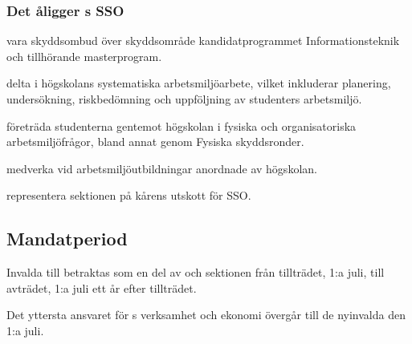 \subsubsection{Det åligger \STYRIT{}s SSO}
    \begin{att}
        \item vara skyddsombud över skyddsområde kandidatprogrammet Informationsteknik och tillhörande masterprogram.
        \item delta i högskolans systematiska arbetsmiljöarbete, vilket inkluderar planering, undersökning, riskbedömning och uppföljning av studenters arbetsmiljö.  
        \item företräda studenterna gentemot högskolan i fysiska och organisatoriska arbetsmiljöfrågor, bland annat genom Fysiska skyddsronder.
        \item medverka vid arbetsmiljöutbildningar anordnade av högskolan.  
        \item representera sektionen på kårens utskott för SSO.
    \end{att} 

\subsection{Mandatperiod}
Invalda till \STYRIT{} betraktas som en del av \STYRIT{} och sektionen från tillträdet, 1:a juli, till avträdet, 1:a juli ett år efter tillträdet.

Det yttersta ansvaret för \STYRIT{}s verksamhet och ekonomi övergår till de nyinvalda den 1:a juli.
